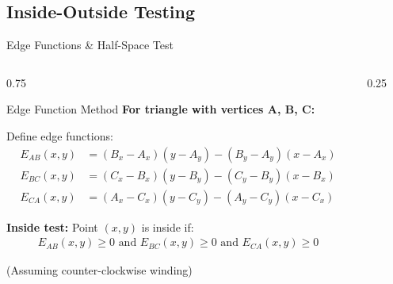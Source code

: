 \subsection{Inside-Outside Testing}
\begin{frame}{Edge Functions \& Half-Space Test}
  \begin{columns}
    \footnotesize
    \begin{column}{0.75\textwidth}
      \begin{mathbox}{Edge Function Method}
        \textbf{For triangle with vertices A, B, C:}

        Define edge functions:
        \begin{align*}
          E_{AB}(x,y) &= (B_x - A_x)(y - A_y) - (B_y - A_y)(x - A_x) \\
          E_{BC}(x,y) &= (C_x - B_x)(y - B_y) - (C_y - B_y)(x - B_x) \\
          E_{CA}(x,y) &= (A_x - C_x)(y - C_y) - (A_y - C_y)(x - C_x)
        \end{align*}

        \textbf{Inside test:} Point $(x,y)$ is inside if:
        \begin{align*}
          E_{AB}(x,y) \geq 0 \text{ and } E_{BC}(x,y) \geq 0 \text{ and } E_{CA}(x,y) \geq 0
        \end{align*}

        (Assuming counter-clockwise winding)
      \end{mathbox}
    \end{column}
    \begin{column}{0.25\textwidth}
    \end{column}
  \end{columns}
\end{frame}

